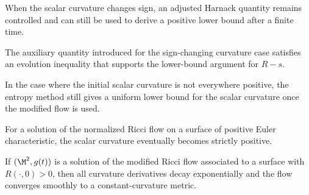 \begin{proposition}
\label{ch05-prop-modified-harnack-control}
When the scalar curvature changes sign, an adjusted Harnack quantity remains controlled and can still be used to derive a positive lower bound after a finite time.
\end{proposition}

\begin{lemma}
\label{ch05-lem-aux-lower-bound}
The auxiliary quantity introduced for the sign-changing curvature case satisfies an evolution inequality that supports the lower-bound argument for \(R-s\).
\end{lemma}

\begin{proposition}
\label{ch05-prop-entropy-lower-bound-sign-changing}
In the case where the initial scalar curvature is not everywhere positive, the entropy method still gives a uniform lower bound for the scalar curvature once the modified flow is used.
\end{proposition}

\begin{proposition}
\label{ch05-prop-eventual-positivity}
For a solution of the normalized Ricci flow on a surface of positive Euler characteristic, the scalar curvature eventually becomes strictly positive.
\end{proposition}

\begin{corollary}
\label{ch05-cor-exponential-convergence-positive}
If \((\M^2,g(t))\) is a solution of the modified Ricci flow associated to a surface with \(R(\cdot,0)>0\), then all curvature derivatives decay exponentially and the flow converges smoothly to a constant-curvature metric.
\end{corollary}

